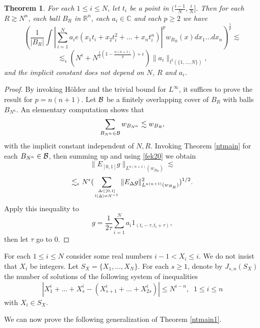 \documentclass[amssymb,amsfonts,12pt]{amsart}
\newtheorem{theorem}{Theorem}[section]
\def\R{{\mathbb R}}
\def\C{{\mathbb C}}
\begin{document}
\begin{theorem}
For each $1\le i\le N$, let $t_i$ be a point in $(\frac{i-1}{N},\frac{i}{N}]$. Then for each $R\gtrsim N^{n}$, each ball $B_R$ in $\R^n$, each $a_{i}\in\C$ and each $p\ge 2$  we have
$$(\frac1{|B_R|}\int|\sum_{i=1}^N a_{i}e(x_1t_i+x_2t_i^2+\ldots+x_nt_i^n)|^{p}w_{B_R}(x)dx_1\ldots dx_n)^{\frac1p}\lesssim$$
\begin{equation}
\label{fek19}
\lesssim_{\epsilon} (N^{\epsilon}+N^{\frac12(1-\frac{n(n+1)}{p})+\epsilon})\|a_{i}\|_{l^2(\{1,\ldots,N\})},
\end{equation}
and the implicit constant does not depend on $N$, $R$ and $a_{i}$.
\end{theorem}
\begin{proof}
By invoking H\"older and the trivial bound for  $L^\infty$, it suffices to prove the result for $p=n(n+1)$.
Let ${\mathcal B}$ be a finitely overlapping cover of $B_R$ with balls $B_{N^n}$. An elementary computation shows that
\begin{equation}
\label{fek20}
\sum_{B_{N^n}\in{\mathcal B}}w_{B_{N^n}}\lesssim w_{B_R},
\end{equation}
with the implicit constant independent of $N,R$. Invoking  Theorem \ref{ntmain} for each $B_{N^n}\in{\mathcal B}$, then summing up and using
\eqref{fek20} we obtain
$$
\|E_{[0,1]}g\|_{L^{n(n+1)}(w_{B_R})}\lesssim $$
$$
\lesssim_\epsilon N^\epsilon(\sum_{\Delta\subset [0,1]\atop{l(\Delta)=N^{-1}}}\|E_\Delta g\|_{L^{n(n+1)}(w_{B_{R}})}^2)^{1/2}.
$$
Apply this inequality to $$g=\frac1{2\tau}\sum_{i=1}^Na_{i}1_{(t_i-\tau,t_i+\tau)},$$
then let $\tau$ go to $0$.

\end{proof}
For each $1\le i\le N$ consider some real  numbers $i-1< {X}_i\le i$. We do not insist that ${X}_i$ be integers. Let $S_X=\{{X}_1,\ldots,{X}_N\}$. For each $s\ge 1$, denote by  ${J}_{s,n}(S_X)$ the number of  solutions  of the following system of inequalities
$$|X_1^i+\ldots+X_s^i-(X_{s+1}^i+\ldots+X_{2s}^i)|\le N^{i-n},\;\;1\le i\le n$$
with $X_i\in S_X$.









We can now prove the following generalization of Theorem \ref{ntmain1}.
\end{document}
